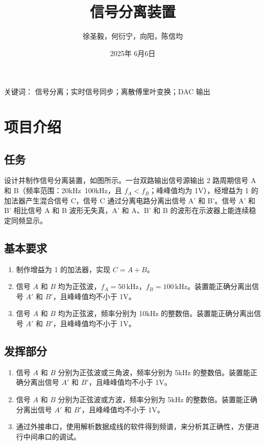 \documentclass{article}
\title{信号分离装置}
\author{徐圣毅，何衍宁，向阳，陈信均}
\date{2025年 6月6日}
\begin{document}
\maketitle
\quad
关键词： 信号分离；实时信号同步；离散傅里叶变换；DAC 输出 

\section{项目介绍}

\subsection{任务}
设计并制作信号分离装置，如图所示。一台双路输出信号源输出 2 路周期信号 A 和 B（频率范围：20kHz~100kHz，且 $f_A < f_B$；峰峰值均为 1V），经增益为 1 的加法器产生混合信号 C，信号 C 通过分离电路分离出信号 A' 和 B'。信号 A' 和 B' 相比信号 A 和 B 波形无失真，A' 和 A、B' 和 B 的波形在示波器上能连续稳定同频显示。



\subsection{基本要求}

\begin{enumerate}
    \item 制作增益为 1 的加法器，实现 $C = A + B$。
    \item 信号 $A$ 和 $B$ 均为正弦波，$f_A = 50\,\mathrm{kHz}$，$f_B = 100\,\mathrm{kHz}$。装置能正确分离出信号 $A'$ 和 $B'$，且峰峰值均不小于 1V。
    \item 信号 $A$ 和 $B$ 均为正弦波，频率分别为 10kHz 的整数倍。装置能正确分离出信号 $A'$ 和 $B'$，且峰峰值均不小于 1V。
\end{enumerate}


\subsection{发挥部分}
\begin{enumerate}
    \item 信号 $A$ 和 $B$ 分别为正弦波或三角波，频率分别为 5kHz 的整数倍。装置能正确分离出信号 $A'$ 和 $B'$，且峰峰值均不小于 1V。
    \item 信号 $A$ 和 $B$ 分别为正弦波或方波，频率分别为 5kHz 的整数倍。装置能正确分离出信号 $A'$ 和 $B'$，且峰峰值均不小于 1V。
    \item 通过外接串口，使用解析数据成线的软件得到频谱，来分析其正确性，方便进行中间串口的调试。
\end{enumerate}
\end{document}
